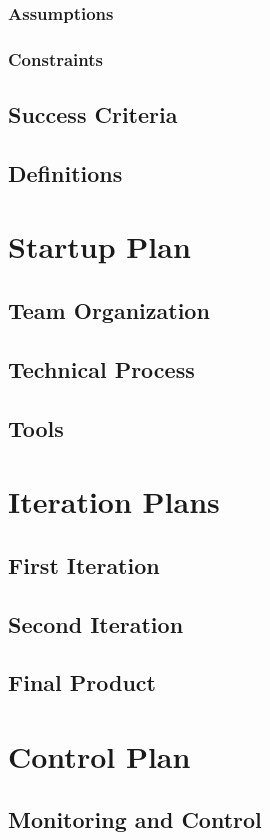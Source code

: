 \documentclass[12pt]{article}
\begin{document}
\subsubsection{Assumptions}
\subsubsection{Constraints}
\subsection{Success Criteria}
\subsection{Definitions}

\section{Startup Plan}
\subsection{Team Organization}
\subsection{Technical Process}
\subsection{Tools}

\section{Iteration Plans}
\subsection{First Iteration}
\subsection{Second Iteration}
\subsection{Final Product}

\section{Control Plan}
\subsection{Monitoring and Control}
\end{document}
